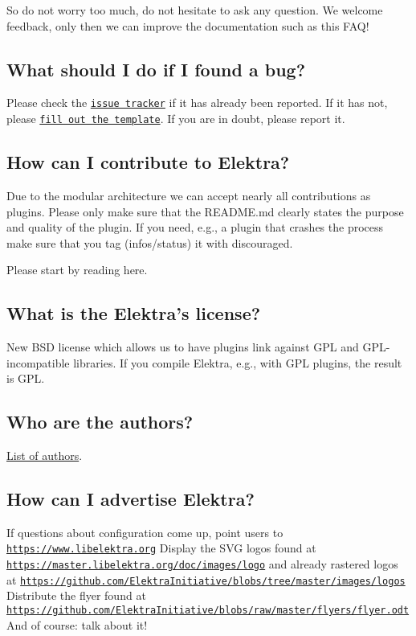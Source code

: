 So do not worry too much, do not hesitate to ask any question. We welcome feedback, only then we can improve the documentation such as this F\+A\+Q!

\subsection*{What should I do if I found a bug?}

Please check the \href{https://git.libelektra.org/issues}{\tt issue tracker} if it has already been reported. If it has not, please \href{https://git.libelektra.org/issues/new}{\tt fill out the template}. If you are in doubt, please report it.

\subsection*{How can I contribute to Elektra?}

Due to the modular architecture we can accept nearly all contributions as plugins. Please only make sure that the R\+E\+A\+D\+M\+E.\+md clearly states the purpose and quality of the plugin. If you need, e.\+g., a plugin that crashes the process make sure that you tag ({\ttfamily infos/status}) it with {\ttfamily discouraged}.

Please start by reading here.

\subsection*{What is the Elektra’s license?}

New B\+SD license which allows us to have plugins link against G\+PL and G\+P\+L-\/incompatible libraries. If you compile Elektra, e.\+g., with G\+PL plugins, the result is G\+PL.

\subsection*{Who are the authors?}

\hyperlink{doc_AUTHORS_md}{List of authors}.

\subsection*{How can I advertise Elektra?}

If questions about configuration come up, point users to \href{https://www.libelektra.org}{\tt https\+://www.\+libelektra.\+org} Display the S\+VG logos found at \href{https://master.libelektra.org/doc/images/logo}{\tt https\+://master.\+libelektra.\+org/doc/images/logo} and already rastered logos at \href{https://github.com/ElektraInitiative/blobs/tree/master/images/logos}{\tt https\+://github.\+com/\+Elektra\+Initiative/blobs/tree/master/images/logos} Distribute the flyer found at \href{https://github.com/ElektraInitiative/blobs/raw/master/flyers/flyer.odt}{\tt https\+://github.\+com/\+Elektra\+Initiative/blobs/raw/master/flyers/flyer.\+odt} And of course\+: talk about it! 